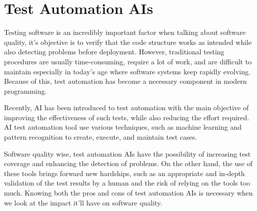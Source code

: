 \chapter{Test Automation AIs}

Testing software is an incredibly important factor when talking about software quality, it's objective is to verify that the code structure works as intended while also detecting problems before deployment. However, traditional testing procedures are usually time-consuming, require a lot of work, and are difficult to maintain especially in today's age where software systems keep rapidly evolving. Because of this, test automation has become a necessary component in modern programming.

Recently, AI has been introduced to test automation with the main objective of improving the effectiveness of such tests, while also reducing the effort required. AI test automation tool use various techniques, such as machine learning and pattern recognition to create, execute, and maintain test cases.

Software quality wise, test automation AIs have the possibility of increasing test coverage and enhancing the detection of problems. On the other hand, the use of these tools brings forward new hardships, such as an appropriate and in-depth validation of the test results by a human and the risk of relying on the tools too much. Knowing both the pros and cons of test automation AIs is necessary when we look at the impact it'll have on software quality.

\begin{table}[h]
\small
\centering
\caption{Feature-based comparison of selected Test Automation AIs}
\label{table_5.1}
\end{table}

